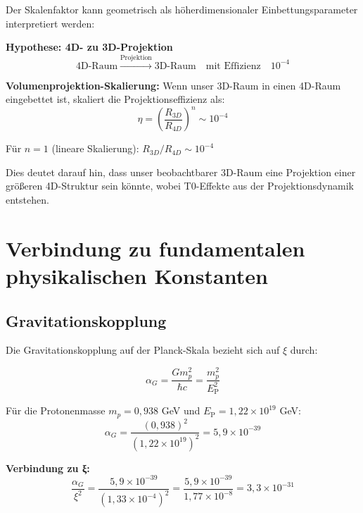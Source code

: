 \documentclass[12pt,a4paper]{report}
\newcommand{\EP}{E_{\text{P}}}            %
\begin{document}
	Der Skalenfaktor kann geometrisch als höherdimensionaler Einbettungsparameter interpretiert werden:
	
	\textbf{Hypothese: 4D- zu 3D-Projektion}
	\begin{equation}
		\text{4D-Raum} \xrightarrow{\text{Projektion}} \text{3D-Raum} \quad \text{mit Effizienz} \quad 10^{-4}
	\end{equation}
	
	\textbf{Volumenprojektion-Skalierung:}
	Wenn unser 3D-Raum in einen 4D-Raum eingebettet ist, skaliert die Projektionseffizienz als:
	\begin{equation}
		\eta = \left(\frac{R_{3D}}{R_{4D}}\right)^n \sim 10^{-4}
	\end{equation}
	
	Für $n = 1$ (lineare Skalierung): $R_{3D}/R_{4D} \sim 10^{-4}$
	
	Dies deutet darauf hin, dass unser beobachtbarer 3D-Raum eine Projektion einer größeren 4D-Struktur sein könnte, wobei T0-Effekte aus der Projektionsdynamik entstehen.
	
	\section{Verbindung zu fundamentalen physikalischen Konstanten}
	\label{sec:fundamental_constants}
	
	\subsection{Gravitationskopplung}
	\label{subsec:gravitational_coupling}
	
	Die Gravitationskopplung auf der Planck-Skala bezieht sich auf $\xi$ durch:
	
	\begin{equation}
		\alpha_G = \frac{Gm_p^2}{\hbar c} = \frac{m_p^2}{\EP^2}
	\end{equation}
	
	Für die Protonenmasse $m_p = 0,938$ GeV und $\EP = 1,22 \times 10^{19}$ GeV:
	\begin{equation}
		\alpha_G = \frac{(0,938)^2}{(1,22 \times 10^{19})^2} = 5,9 \times 10^{-39}
	\end{equation}
	
	\textbf{Verbindung zu ξ:}
	\begin{equation}
		\frac{\alpha_G}{\xi^2} = \frac{5,9 \times 10^{-39}}{(1,33 \times 10^{-4})^2} = \frac{5,9 \times 10^{-39}}{1,77 \times 10^{-8}} = 3,3 \times 10^{-31}
	\end{equation}
	
\end{document}
